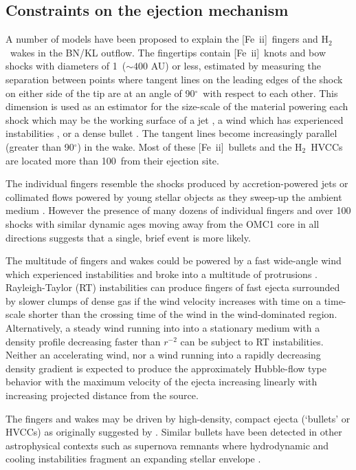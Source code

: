 \documentclass{aa}
\newcommand\arcdeg{\mbox{$^\circ$}\xspace}  %
\newcommand{\Feii}{[Fe~{\sc ii}]}
\newcommand{\hh}{\ensuremath{\textrm{H}_{2}}}			%
\begin{document}
\subsection{Constraints on the ejection mechanism}

A number of models have been proposed to explain the \Feii\  fingers and \hh\ 
wakes in the  BN/KL outflow.     The fingertips contain  \Feii\ knots and bow shocks  
with diameters of  1\arcsec\ ($\sim400$ AU) or less,  estimated by measuring the 
separation  between points  where tangent lines on the leading edges of the shock 
on either side of the tip are at an angle of 90\arcdeg\  with respect to each other.    
This dimension is used as an estimator for the size-scale of the material powering 
each shock which may be the working surface of a jet \citep{SmithRosen2007},  
a wind which has experienced instabilities \citep{StoneXuMundy1995}, 
or a dense bullet \citep{AllenBurton93}.    The tangent lines become increasingly 
parallel (greater than  90\arcdeg ) in the wake. Most of these \Feii\ bullets and 
the \hh\ HVCCs  are located more than  100\arcsec\ from their ejection site.    

The individual fingers resemble the shocks  produced by accretion-powered jets or 
collimated flows powered by young stellar objects as they sweep-up the  ambient  
medium \citep{ReipurthBally2001}.   However the presence of many dozens of
individual fingers and over 100 shocks with similar dynamic ages moving
away from the OMC1 core in all directions suggests that a single, brief event 
is more likely.   
 
The multitude of fingers and wakes  could be powered by a  fast  wide-angle 
wind which experienced instabilities  and  broke into a multitude of  protrusions 
\citep{StoneXuMundy1995,McCaughrean_MacLow1997}.    Rayleigh-Taylor (RT)
instabilities can produce fingers of fast ejecta surrounded by slower clumps of dense 
gas if the wind velocity increases with time on a time-scale shorter than the 
crossing time of the wind in the wind-dominated region.     Alternatively,   
a steady wind running into into a stationary  medium with a density profile  
decreasing faster than $r^{-2}$ can be subject to RT instabilities.   Neither an 
accelerating wind, nor a wind running into a rapidly decreasing  density gradient 
is  expected to produce the approximately Hubble-flow type  behavior with the  
maximum velocity of the ejecta  increasing linearly with increasing 
projected  distance from the source.    

The  fingers and wakes may be driven by high-density, compact ejecta
(`bullets'  or HVCCs)  as originally suggested by \citet{AllenBurton93}.    
Similar bullets have been detected in other astrophysical contexts such
as supernova remnants where hydrodynamic and cooling instabilities fragment
an expanding stellar envelope \citep{Fesen2011,MilisavljevicFesen2013}.  %
\end{document}
